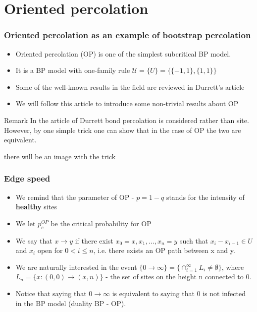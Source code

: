 
\section{Oriented percolation}

\begin{frame}
	\frametitle{Oriented percolation as an example of  bootstrap percolation}
	
\begin{itemize}
\item Oriented percolation (OP) is one of the simplest subcritical BP model.
\item It is a BP model with one-family rule $\mathcal{U} = \{U\} = \{\{-1, 1\}, \{1, 1\}\}$
\item Some of the well-known results in the field are reviewed in Durrett's article \cite{10.1214/aop/1176993140}
\item We will follow this article to introduce some non-trivial results about OP
\end{itemize}

\begin{alertblock}{Remark}
	In the article of Durrett bond percolation is considered rather than site. However, by one simple trick one can show that in the case of OP the two are equivalent.
\end{alertblock}

\end{frame}

\begin{frame}
	there will be an image with the trick
\end{frame}

\begin{frame}
	\frametitle{Edge speed}
	\begin{itemize}
		\item We remind that the parameter of OP - $p = 1 - q$ stands for the intensity of \textbf{healthy} sites
		\item We let $p_{c}^{OP}$ be the critical probability for OP
		\item We say that $x \rightarrow y$  if there exist $x_{0} = x, x_{1}, \ldots, x_{n} = y$ such that $x_{i} - x_{i - 1} \in U$ and $x_{i}$ open for $0 < i \leq n$, i.e. there exists an OP path between x and y.
		\item We are naturally interested in the event $\{0 \rightarrow \infty \} = \{ \cap_{i = 1}^{\infty} L_{i} \neq \emptyset \}$, where $L_{n} = \{x: (0, 0) \rightarrow (x, n) \}$ - the set of sites on the height n connected to 0.
		\item Notice that saying that $0 \rightarrow \infty$ is equivalent to saying that 0 is not infected in the BP model (duality BP - OP).
	\end{itemize}
\end{frame}
	
